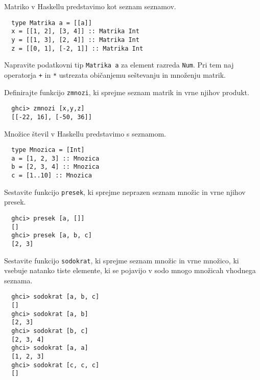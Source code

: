 \documentclass[arhiv]{../izpit}
\begin{document}


Matriko v Haskellu predstavimo kot seznam seznamov.

\begin{verbatim}
  type Matrika a = [[a]]
  x = [[1, 2], [3, 4]] :: Matrika Int
  y = [[1, 3], [2, 4]] :: Matrika Int
  z = [[0, 1], [-2, 1]] :: Matrika Int
\end{verbatim}

\podnaloga
  Napravite podatkovni tip \texttt{Matrika a} za element razreda \texttt{Num}.
  Pri tem naj operatorja \texttt{+} in \texttt{*} ustrezata običanjemu seštevanju
  in množenju matrik.

\podnaloga
  Definirajte funkcijo \texttt{zmnozi}, ki sprejme seznam matrik in vrne
  njihov produkt.
  \begin{verbatim}
  ghci> zmnozi [x,y,z]
  [[-22, 16], [-50, 36]]
  \end{verbatim}



Množice števil v Haskellu predstavimo s seznamom.

\begin{verbatim}
  type Mnozica = [Int]
  a = [1, 2, 3] :: Mnozica
  b = [2, 3, 4] :: Mnozica
  c = [1..10] :: Mnozica
\end{verbatim}

\podnaloga
  Sestavite funkcijo \texttt{presek}, ki sprejme neprazen seznam množic
  in vrne njihov presek.

  \begin{verbatim}
  ghci> presek [a, []]
  []
  ghci> presek [a, b, c]
  [2, 3]
  \end{verbatim}

\podnaloga
  Sestavite funkcijo \texttt{sodokrat}, ki sprejme seznam množic in vrne
  množico, ki vsebuje natanko tiste elemente, ki se pojavijo v sodo mnogo
  množicah vhodnega seznama.

  \begin{verbatim}
  ghci> sodokrat [a, b, c]
  []
  ghci> sodokrat [a, b]
  [2, 3]
  ghci> sodokrat [b, c]
  [2, 3, 4]
  ghci> sodokrat [a, a]
  [1, 2, 3]
  ghci> sodokrat [c, c, c]
  []
  \end{verbatim}
\end{document}
